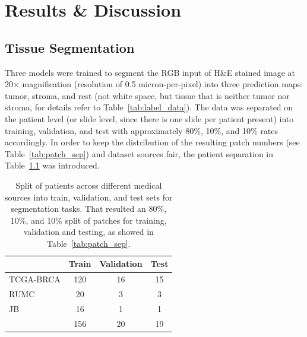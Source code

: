 \chapter{Results \& Discussion}
\section{Tissue Segmentation}  \label{res_tissue_segm}
Three models were trained to segment the RGB input of H\&E stained image at 20$\times$ magnification
(resolution of 0.5 micron-per-pixel) into three prediction maps:
tumor, stroma, and rest (not white space, but tissue that is neither tumor nor stroma,
for details refer to Table~\ref*{tab:label_data}). The data was separated on the patient level
(or slide level, since there is one slide per patient present) into training, validation, and test
with approximately 80\%, 10\%, and 10\% rates accordingly.
In order to keep the distribution of the resulting patch numbers (see Table~\ref*{tab:patch_sep})
and dataset sources fair, the patient separation in Table~\ref*{tab:patients_sep} was introduced.
\begin{table}[H]
    \centering
    \begin{tabular}{ l c c c }
        \hline
        & Train & Validation & Test \\
        \hline
        TCGA-BRCA & 120 & 16 & 15 \\
        RUMC & 20 & 3 & 3 \\
        JB & 16 & 1 & 1 \\
        \hline
        & 156 & 20 & 19 \\
    \end{tabular}
\caption{\label{tab:patients_sep} Split of patients across different medical sources
into train, validation, and test sets for segmentation tasks. That resulted an 80\%, 10\%, and 10\%
split of patches for training, validation and testing, as showed in Table~\ref{tab:patch_sep}.}
\end{table}
